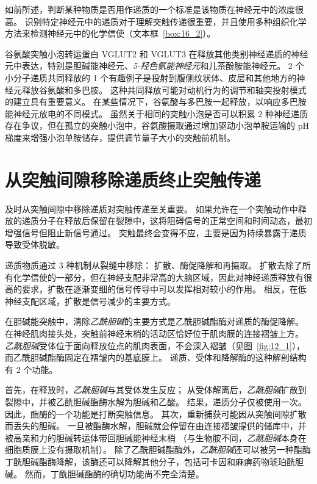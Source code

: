 如前所述，判断某种物质是否用作递质的一个标准是该物质在神经元中的浓度很高。
识别特定神经元中的递质对于理解突触传递很重要，并且使用多种组织化学方法来检测神经元中的化学信使（文本框~\ref{box:16_2}）。


谷氨酸突触小泡转运蛋白 VGLUT2 和 VGLUT3 在释放其他类别神经递质的神经元中表达，特别是胆碱能神经元、\textit{5-羟色氨能神经元}和儿茶酚胺能神经元。
2 个小分子递质共同释放的 1 个有趣例子是投射到腹侧纹状体、皮层和其他地方的神经元释放谷氨酸和多巴胺。
这种共同释放可能对动机行为的调节和轴突投射模式的建立具有重要意义。
在某些情况下，谷氨酸与多巴胺一起释放，以响应多巴胺能神经元放电的不同模式。
虽然关于相同的突触小泡是否可以积累 2 种神经递质存在争议，但在孤立的突触小泡中，谷氨酸摄取通过增加驱动小泡单胺运输的 pH 梯度来增强小泡单胺储存，提供调节量子大小的突触前机制。



\section{从突触间隙移除递质终止突触传递}

及时从突触间隙中移除递质对突触传递至关重要。
如果允许在一个突触动作中释放的递质分子在释放后保留在裂隙中，这将阻碍信号的正常空间和时间动态，最初增强信号但阻止新信号通过。
突触最终会变得不应，主要是因为持续暴露于递质导致受体脱敏。


递质物质通过 3 种机制从裂缝中移除：
扩散、酶促降解和再摄取。
扩散去除了所有化学信使的一部分，但在神经支配非常高的大脑区域，因此对神经递质释放有很高的要求，扩散在逐渐变细的信号传导中可以发挥相对较小的作用。
相反，在低神经支配区域，扩散是信号减少的主要方式。


在胆碱能突触中，清除\textit{乙酰胆碱}的主要方式是乙酰胆碱酯酶对递质的酶促降解。
在神经肌肉接头处，突触前神经末梢的活动区恰好位于肌肉膜的连接褶皱上方。
\textit{乙酰胆碱}受体位于面向释放位点的肌肉表面，不会深入褶皱（见图~\ref{fig:12_1}），而乙酰胆碱酯酶固定在褶皱内的基底膜上。
递质、受体和降解酶的这种解剖结构有 2 个功能。


首先，在释放时，\textit{乙酰胆碱}与其受体发生反应；
从受体解离后，\textit{乙酰胆碱}扩散到裂隙中，并被乙酰胆碱酯酶水解为胆碱和乙酸。
结果，递质分子仅被使用一次。
因此，酯酶的一个功能是打断突触信息。
其次，重新捕获可能因从突触间隙扩散而丢失的胆碱。
一旦被酯酶水解，胆碱就会停留在由连接褶皱提供的储库中，并被高亲和力的胆碱转运体带回胆碱能神经末梢
（与生物胺不同，\textit{乙酰胆碱}本身在细胞质膜上没有摄取机制）。
除了乙酰胆碱酯酶外，\textit{乙酰胆碱}还可以被另一种酯酶丁酰胆碱酯酶降解，该酶还可以降解其他分子，包括可卡因和麻痹药物琥珀酰胆碱。
然而，丁酰胆碱酯酶的确切功能尚不完全清楚。


